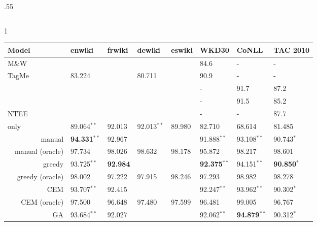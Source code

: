 \documentclass[letterpaper]{article}
\newcommand*\rot{\rotatebox{90}}
\newcommand{\oneS}{\ensuremath{{}^{\textstyle *}}}
\newcommand{\twoS}{\ensuremath{{}^{\textstyle **}}}
\begin{document}
\begin{table*}[ht]
\begin{center}
\begin{subtable}{.55\linewidth}
\begin{center}
\begin{tabular}{ |l|r|r|r|r|}
\hline
\end{tabular}
\end{center}
\label{table:ner}
    \end{subtable}
    \begin{subtable}{1\linewidth}
    \caption{Entity Linking model Comparison. Significant improvements over prior work denoted by \oneS\, for , and \twoS\, for .}
\begin{center}
\begin{tabular}{ |c|r|l|l|l|l|l|l|l|}
\hline
     \multicolumn{2}{|l|}{Model} & enwiki & frwiki & dewiki & eswiki & \textsc{WKD30} & CoNLL & TAC 2010\\
\hline
\multicolumn{2}{|l|}{M\&W\cite{milne2008learning}} &        & & & & 84.6  & - & -\\
\multicolumn{2}{|l|}{TagMe \cite{tagme}}                       & 83.224 & & 80.711 & & 90.9 & - & -\\
\multicolumn{2}{|l|}{\cite{globerson2016collective}}      &
   & & & &        - & 91.7 & 87.2\\
\multicolumn{2}{|l|}{\cite{yamada2016joint}}      &        & & & &   - & 91.5 & 85.2\\
\multicolumn{2}{|l|}{NTEE \cite{yamada2017learning}}      &        & & & &        - & - & 87.7\\
\hline
\multicolumn{2}{|l|}{ only }    & 89.064\twoS
&  92.013 &  92.013\twoS &  89.980 & 82.710 &  68.614 & 81.485\\
\hline
\multirow{10}{*}{\rot{Ours}} & manual                & {\bf94.331\twoS} & 92.967 & &        & 91.888\twoS & 93.108\twoS & 90.743\oneS \\
& manual (oracle)                                    & 97.734  & 98.026 & 98.632 & 98.178 & 95.872 & 98.217 & 98.601\\
& greedy                                             & 93.725\twoS  & {\bf 92.984} & & & {\bf 92.375\twoS} & 94.151\twoS & {\bf90.850\oneS}\\
& greedy (oracle)                                    & 98.002  & 97.222 & 97.915 & 98.246 & 97.293 & 98.982 & 98.278\\
& CEM                                                & 93.707\twoS  & 92.415 & & & 92.247\twoS & 93.962\twoS & 90.302\oneS\\
& CEM (oracle)                                       & 97.500  & 96.648 & 97.480 & 97.599 & 96.481 & 99.005 & 96.767\\
& GA                                                 & 93.684\twoS  & 92.027 & & & 92.062\twoS & {\bf 94.879\twoS} & 90.312\oneS\\

\end{tabular}
\end{center}
\end{subtable}
\end{center}
\end{table*}
\end{document}
